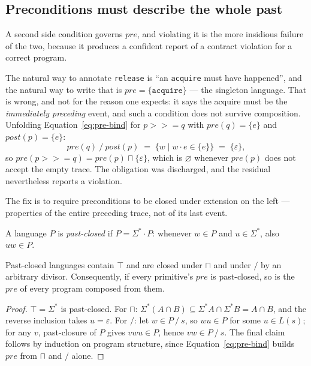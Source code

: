 \documentclass[acmsmall,screen]{acmart}
\newcommand{\pre}{\mathit{pre}}
\newcommand{\post}{\mathit{post}}
\newcommand{\rquot}{\mathbin{/}}           %
\begin{document}
\subsection{Preconditions must describe the whole past}
\label{sec:pre-condition}

A second side condition governs $\pre$, and violating it is the more
insidious failure of the two, because it produces a confident report of a
contract violation for a correct program.

The natural way to annotate \lstinline{release} is ``an \lstinline{acquire}
must have happened'', and the natural way to write that is
$\pre = \{\mathtt{acquire}\}$ --- the singleton language.
That is wrong, and not for the reason one expects: it says the acquire must
be the \emph{immediately preceding} event, and such a condition does not
survive composition.
Unfolding Equation~\eqref{eq:pre-bind} for
$p \mathbin{>\!\!>\!\!=} q$ with $\pre(q) = \{e\}$ and $\post(p) = \{e\}$:
\[
  \pre(q) \rquot \post(p) \;=\; \{w \mid w \cdot e \in \{e\}\}
                          \;=\; \{\varepsilon\},
\]
so $\pre(p \mathbin{>\!\!>\!\!=} q) = \pre(p) \sqcap \{\varepsilon\}$,
which is $\varnothing$ whenever $\pre(p)$ does not accept the empty trace.
The obligation was discharged, and the residual nevertheless reports a
violation.

The fix is to require preconditions to be closed under extension on the
left --- properties of the entire preceding trace, not of its last event.

\begin{definition}
A language $P$ is \emph{past-closed} if $P = \Sigma^* \cdot P$: whenever
$w \in P$ and $u \in \Sigma^*$, also $uw \in P$.
\end{definition}

\begin{proposition}[Closure]
\label{prop:past-closed}
Past-closed languages contain $\top$ and are closed under $\sqcap$ and
under $\rquot$ by an arbitrary divisor.
Consequently, if every primitive's $\pre$ is past-closed, so is the $\pre$
of every program composed from them.
\end{proposition}
\begin{proof}
$\top = \Sigma^*$ is past-closed.
For $\sqcap$: $\Sigma^*(A \cap B) \subseteq \Sigma^*A \cap \Sigma^*B
= A \cap B$, and the reverse inclusion takes $u = \varepsilon$.
For $\rquot$: let $w \in P \rquot s$, so $wu \in P$ for some $u \in L(s)$;
for any $v$, past-closure of $P$ gives $vwu \in P$, hence
$vw \in P \rquot s$.
The final claim follows by induction on program structure, since
Equation~\eqref{eq:pre-bind} builds $\pre$ from $\sqcap$ and $\rquot$ alone.
\end{proof}
\end{document}
